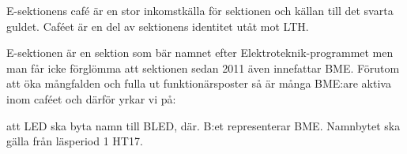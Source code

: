 \documentclass[../_main/handlingar.tex]{subfiles}
\begin{document}
E-sektionens café är en stor inkomstkälla för sektionen och källan till det svarta guldet. Caféet är en del av sektionens identitet utåt mot LTH.

E-sektionen är en sektion som bär namnet efter Elektroteknik-programmet men man får icke förglömma att sektionen sedan 2011 även innefattar BME. Förutom att öka mångfalden och fulla ut funktionärsposter så är många BME:are aktiva inom caféet och därför yrkar vi på:
\begin{attsatser}
    \att att LED ska byta namn till BLED, där. B:et representerar BME. Namnbytet ska gälla från läsperiod 1 HT17.
\end{attsatser}
\begin{signatures}{1}
    \mvh
    \signature{Godtycklig BME:are}{}
\end{signatures}
\end{document}

